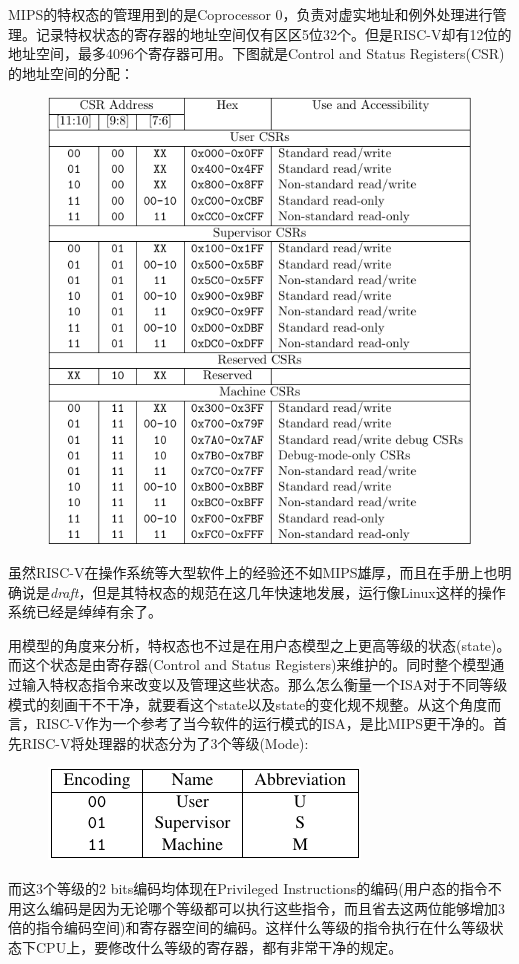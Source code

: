 \documentclass{article}
\begin{document}
\begin{enumerate}
	MIPS的特权态的管理用到的是Coprocessor 0，负责对虚实地址和例外处理进行管理。记录特权状态的寄存器的地址空间仅有区区5位32个。但是RISC-V却有12位的地址空间，最多4096个寄存器可用。下图就是Control and Status Registers(CSR) 的地址空间的分配：~\cite{privileged}
	\begin{figure}[H]
		\centering
		\includegraphics[width=0.4\linewidth,height=0.26\textheight]{figs/CSR.png}
	\end{figure}
	
	虽然RISC-V在操作系统等大型软件上的经验还不如MIPS雄厚，而且在手册上也明确说是\textit{draft}，但是其特权态的规范在这几年快速地发展，运行像Linux这样的操作系统已经是绰绰有余了。
	
	用模型的角度来分析，特权态也不过是在用户态模型之上更高等级的状态(state)。而这个状态是由寄存器(Control and Status Registers)来维护的。同时整个模型通过输入特权态指令来改变以及管理这些状态。那么怎么衡量一个ISA对于不同等级模式的刻画干不干净，就要看这个state以及state的变化规不规整。从这个角度而言，RISC-V作为一个参考了当今软件的运行模式的ISA，是比MIPS更干净的。首先RISC-V将处理器的状态分为了3个等级(Mode):~\cite{privileged}
	\begin{figure}[h]
		\centering
		\includegraphics[width=0.3\linewidth]{figs/mode.png}
	\end{figure}

	而这3个等级的2 bits编码均体现在Privileged Instructions的编码(用户态的指令不用这么编码是因为无论哪个等级都可以执行这些指令，而且省去这两位能够增加3倍的指令编码空间)和寄存器空间的编码。这样什么等级的指令执行在什么等级状态下CPU上，要修改什么等级的寄存器，都有非常干净的规定。
	

\end{enumerate}
\end{document}
